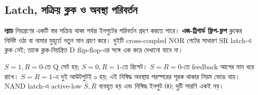 \subsection{Latch, সক্রিয় ক্লক ও অবস্থা পরিবর্তন}
\textbf{ল্যাচ} নিয়ন্ত্রণের একটি স্তর সক্রিয় থাকা পর্যন্ত ইনপুটের পরিবর্তন গ্রহণ করতে পারে। \textbf{এজ-ট্রিগার্ড ফ্লিপ-ফ্লপ} ক্লকের নির্দিষ্ট ওঠা বা নামার মুহূর্তে নতুন মান গ্রহণ করে। দুইটি cross-coupled NOR গেটের সাধারণ SR latch-এ ক্লক নেই; তাকে ক্লক-নিয়ন্ত্রিত D flip-flop-এর সঙ্গে এক করে দেখানো যাবে না।

\begin{center}
\begin{minipage}{\linewidth}\centering\begin{chThreeDiagram}\end{chThreeDiagram}

\end{minipage}
\end{center}
$S=1,R=0$-তে Q সেট হয়; $S=0,R=1$-তে রিসেট। $S=R=0$-তে feedback আগের মান ধরে রাখে। $S=R=1$-এ দুই আউটপুটই ০ হয়; এই নিষিদ্ধ অবস্থায় পরস্পরের পূরক থাকার নিয়ম ভেঙে যায়। NAND latch-এ active-low $\overline S,\overline R$ ব্যবহৃত হয় এবং নিষিদ্ধ ইনপুট 00; দুটি সারণি একই নয়।


